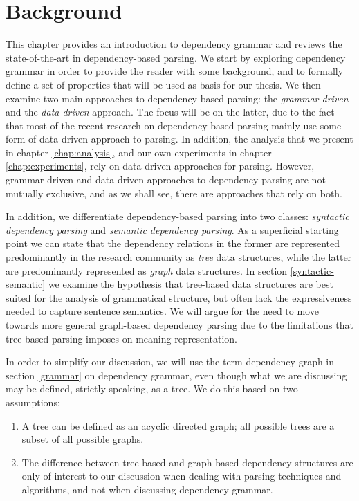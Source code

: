 \chapter{Background}
\label{chap:background}

This chapter provides an introduction to dependency grammar and reviews the state-of-the-art in dependency-based parsing. We start by exploring dependency grammar in order to provide the reader with some background, and to formally define a set of properties that will be used as basis for our thesis. We then examine two main approaches to dependency-based parsing: the \textit{grammar-driven} and the \textit{data-driven} approach. The focus will be on the latter, due to the fact that most of the recent research on dependency-based parsing mainly use some form of data-driven approach to parsing. In addition, the analysis that we present in chapter \ref{chap:analysis}, and our own experiments in chapter \ref{chap:experiments}, rely on data-driven approaches for parsing. However, grammar-driven and data-driven approaches to dependency parsing are not mutually exclusive, and as we shall see, there are approaches that rely on both.

In addition, we differentiate dependency-based parsing into two classes: \textit{syntactic dependency parsing} and \textit{semantic dependency parsing}. As a superficial starting point we can state that the dependency relations in the former are represented predominantly in the research community as \textit{tree} data structures, while the latter are predominantly represented as \textit{graph} data structures. In section \ref{syntactic-semantic} we examine the hypothesis that tree-based data structures are best suited for the analysis of grammatical structure, but often lack the expressiveness needed to capture sentence semantics. We will argue for the need to move towards more general graph-based dependency parsing due to the limitations that tree-based parsing imposes on meaning representation.

In order to simplify our discussion, we will use the term dependency graph in section \ref{grammar} on dependency grammar, even though what we are discussing may be defined, strictly speaking, as a tree. We do this based on two assumptions:

\begin{enumerate}
\item A tree can be defined as an acyclic directed graph; all possible trees are a subset of all possible graphs.
\item The difference between tree-based and graph-based dependency structures are only of interest to our discussion when dealing with parsing techniques and algorithms, and not when discussing dependency grammar.
\end{enumerate}

